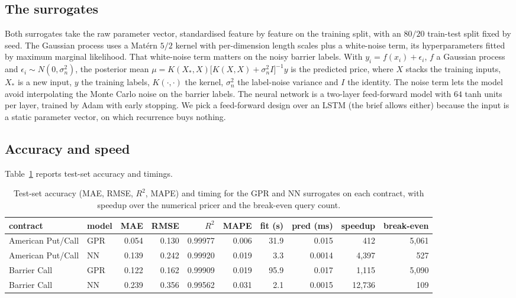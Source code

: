 \documentclass[12pt,a4paper]{article}
\begin{document}
\subsection{The surrogates}
Both surrogates take the raw parameter vector, standardised feature by feature
on the training split, with an $80/20$ train-test split fixed by seed. The
Gaussian process uses a Mat\'ern $5/2$ kernel with per-dimension length scales
plus a white-noise term, its hyperparameters fitted by maximum marginal
likelihood. That white-noise term matters on the noisy barrier labels. With
$y_i=f(x_i)+\epsilon_i$, $f$ a Gaussian process and
$\epsilon_i\sim N(0,\sigma_n^2)$, the posterior mean
$\mu=K(X_*,X)\big[K(X,X)+\sigma_n^2 I\big]^{-1}y$ is the predicted price, where
$X$ stacks the training inputs, $X_*$ is a new input, $y$ the training labels,
$K(\cdot,\cdot)$ the kernel, $\sigma_n^2$ the label-noise variance and $I$ the
identity. The noise term lets the model avoid interpolating the Monte Carlo
noise on the barrier labels. The neural network is a two-layer feed-forward
model with $64$ tanh units per layer, trained by Adam with early stopping. We
pick a feed-forward design over an LSTM (the brief allows either) because the
input is a static parameter vector, on which recurrence buys nothing.

\subsection{Accuracy and speed}
Table~\ref{tab:ml_metrics} reports test-set accuracy and timings.

\begin{table}[ht]
\centering
\footnotesize
\setlength{\tabcolsep}{3pt}
\begin{tabular}{llrrrrrrrr}
\toprule
contract & model & MAE & RMSE & $R^2$ & MAPE & fit (s) & pred (ms) & speedup & break-even \\
\midrule
American Put/Call & GPR & 0.054 & 0.130 & 0.99977 & 0.006 & 31.9 & 0.015  &   412 & 5{,}061 \\
American Put/Call & NN  & 0.139 & 0.242 & 0.99920 & 0.019 &  3.3 & 0.0014 &  4{,}397 &   527 \\
Barrier Call      & GPR & 0.122 & 0.162 & 0.99909 & 0.019 & 95.9 & 0.017  &  1{,}115 & 5{,}090 \\
Barrier Call      & NN  & 0.239 & 0.356 & 0.99562 & 0.031 &  2.1 & 0.0015 & 12{,}736 &   109 \\
\bottomrule
\end{tabular}
\caption{Test-set accuracy (MAE, RMSE, $R^2$, MAPE) and timing for the GPR and NN
surrogates on each contract, with speedup over the numerical pricer and the
break-even query count.}
\label{tab:ml_metrics}
\end{table}
\end{document}

